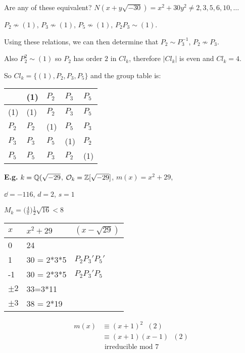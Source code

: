 \documentclass[11pt]{article}
\begin{document}
Are any of these equivalent? $N(x+y\sqrt{-30}) = x^2 + 30y^2 \neq 2, 3,5,6,10, \dots$
\spa

$P_2 \not \sim (1)$, $P_3 \not \sim (1) $, $P_5 \not \sim (1)$, $P_2P_3 \sim (1) $.

Using these relations, we can then determine that $P_2 \sim P_3^{-1} $, $P_2 \not \sim P_3$.
\spa

Also $P_2^2 \sim (1)$ so $P_2$ has order $2$ in $Cl_k$, therefore $|Cl_k|$ is even and $Cl_k = 4$.

So $Cl_k = \{(1), P_2,P_3,P_5 \}$ and the group table is:
\spac

\begin{tabular}{l|llll}
	      & (1)   & $P_2$ & $P_3$ & $P_5$ \\ \hline
	      (1)   & (1)   & $P_2$ & $P_3$ & $P_5$ \\
	      $P_2$ & $P_2$ & (1)   & $P_5$ & $P_3$ \\
	      $P_3$ & $P_3$ & $P_5$ & (1)   & $P_2$ \\
	      $P_5$ & $P_5$ & $P_3$ & $P_2$ & (1)  
\end{tabular}
\spac
\spac
\textbf{E.g.} $k = \mathbb{Q}(\sqrt{-29}$, \hspace{7pt} $\mathcal{O}_k = \mathbb{Z}[\sqrt{-29}]$, \hspace{7pt} $m(x) = x^2 + 29$, \hspace{7pt}

$\dd = -116$, $ d=2$, $s=1$
\spac


$M_k = \big(\frac{4}{\pi}\big) \frac12 \sqrt{16} < 8$
\spac

\begin{tabular}{|l|l|l|}
	$x$     & $x^2 + 29$ & $(x-\sqrt{29})$ \\ \hline
	0       & 24         &                 \\
	1       & 30 = 2*3*5 & $P_2P_3'P_5'$   \\
	-1      & 30 = 2*3*5 & $P_2P_3'P_5$    \\
	$\pm 2$ & 33=3*11    &                 \\
	$\pm 3$ & 38 = 2*19      
\end{tabular}


\begin{align*}
	m(x) &\equiv (x+1)^2 \hspace{7pt} (2)\\
	& \equiv (x+1)(x-1)  \hspace{7pt} (2)\\
	& \text{ irreducible mod 7}
\end{align*}
\end{document}
